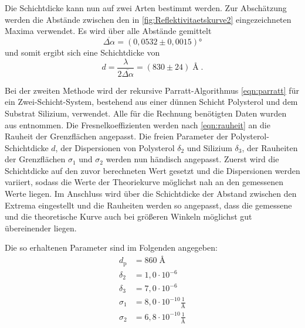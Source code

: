     Die Schichtdicke kann nun auf zwei Arten bestimmt werden.
    Zur Abschätzung werden die Abstände zwischen den in \autoref{fig:Reflektivitaetskurve2} eingezeichneten Maxima verwendet.
    Es wird über alle Abstände gemittelt
    \begin{equation*}
        \overline{\varDelta \alpha} = (0,0532 \pm 0,0015)°
    \end{equation*}
    und somit ergibt sich eine Schichtdicke von
    \begin{equation*}
        d = \frac{\lambda}{2 \overline{\Delta \alpha}} = (830 \pm 24) \; \text{\AA} \;.
    \end{equation*}

    Bei der zweiten Methode wird der rekursive Parratt-Algorithmus \ref{eqn:parratt} für ein Zwei-Schicht-System, bestehend aus einer dünnen Schicht Polysterol und dem Substrat Silizium, verwendet. Alle für die Rechnung benötigten Daten wurden aus \cite{tu_dortmund_versuchsanleitung_2021_e1} entnommen.
    Die Fresnelkoeffizienten werden nach \autoref{eqn:rauheit} an die Rauheit der Grenzflächen angepasst.
    Die freien Parameter der Polysterol-Schichtdicke $d$, der Dispersionen von Polysterol $\delta_2$ und Silizium $\delta_3$, der Rauheiten der Grenzflächen $\sigma_1$ und $\sigma_2$ werden nun händisch angepasst.
    Zuerst wird die Schichtdicke auf den zuvor berechneten Wert gesetzt und die Dispersionen werden variiert, sodass die Werte der Theoriekurve möglichst nah an den gemessenen Werte liegen.
    Im Anschluss wird über die Schichtdicke der Abstand zwischen den Extrema eingestellt und die Rauheiten werden so angepasst, dass die gemessene und die theoretische Kurve auch bei größeren Winkeln möglichst gut übereinender liegen.

    Die so erhaltenen Parameter sind im Folgenden angegeben:
    \begin{align*}
        d_{\mathrm{p}} &= 860 \; \text{\AA} \\
        \delta_2 &= 1,0 \cdot 10^{-6} \\
        \delta_3 &= 7,0 \cdot 10^{-6} \\
        \sigma_1 &= 8,0 \cdot 10^{-10} \frac{1}{\text{\AA}}\\
        \sigma_2 &= 6,8 \cdot 10^{-10} \frac{1}{\text{\AA}}\\
    \end{align*}
    
